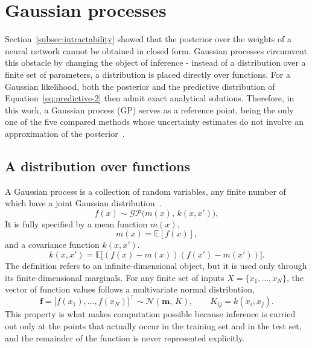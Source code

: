 \section{Gaussian processes}
\label{sec:gaussian-processes}

Section~\ref{subsec:intractability} showed that the posterior over the weights of a neural
network cannot be obtained in closed form. Gaussian processes circumvent this obstacle by
changing the object of inference - instead of a distribution over a finite set of parameters,
a distribution is placed directly over functions. For a Gaussian likelihood, both the
posterior and the predictive distribution of Equation~\eqref{eq:predictive-2} then admit exact
analytical solutions. Therefore, in this work, a Gaussian process (GP) serves as a reference
point, being the only one of the five compared methods whose uncertainty estimates do not involve an approximation of the posterior~\cite{rasmussen2006}.

\subsection{A distribution over functions}
\label{subsec:gp-definition}

A Gaussian process is a collection of random variables, any finite number of which have a
joint Gaussian distribution~\cite{rasmussen2006}. 
\begin{equation}
    f(x) \sim \mathcal{GP}\bigl(m(x),\, k(x, x')\bigr),
\end{equation}
It is fully specified by a mean function
$m(x)$,
%
\begin{equation}
    m(x) = \mathbb{E}\left[f(x)\right],
    \label{eq:gp-definition}
\end{equation}
%
and a covariance function $k(x, x')$.
\begin{equation}
    k(x, x') = \mathbb{E}\bigl[(f(x) - m(x))(f(x') - m(x'))\bigr] .
    \label{eq:gp-covariance}
\end{equation}
%
The definition refers to an infinite-dimensional object, but it is used only through its
finite-dimensional marginals. For any finite set of inputs $X = \{x_1, \dots, x_N\}$, the
vector of function values follows a multivariate normal distribution,
%
\begin{equation}
    \mathbf{f} = \bigl[f(x_1), \dots, f(x_N)\bigr]^{\!\top}
    \sim \mathcal{N}\!\left(\mathbf{m},\, K\right),
    \qquad
    K_{ij} = k(x_i, x_j) .
    \label{eq:gp-marginal}
\end{equation}
%
This property is what makes computation possible because inference is carried out only at the points that actually occur in the training set and in the test set, and the remainder of the function is never represented explicitly.


